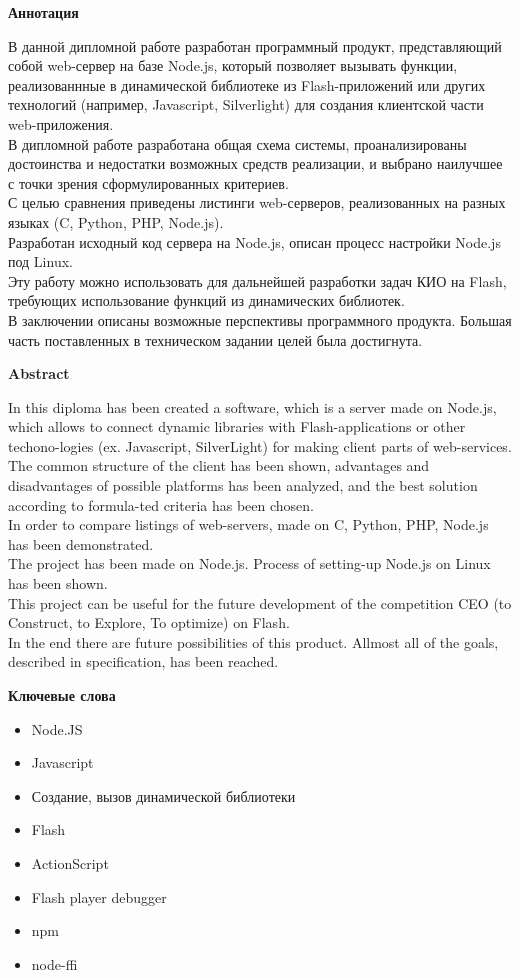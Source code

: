 \begin{center}
\textbf{Аннотация}
\end{center}
В данной дипломной работе разработан программный продукт, представляющий собой web-сервер на базе Node.js, который позволяет вызывать функции, реализованнные в динамической библиотеке из Flash-приложений или других технологий (например, Javascript, Silverlight) для создания клиентской части web-приложения.\\
В дипломной работе разработана общая схема системы, проанализированы достоинства и недостатки возможных средств реализации, и выбрано наилучшее с точки зрения сформулированных критериев. \\
С целью сравнения приведены листинги web-серверов, реализованных на разных языках (C, Python, PHP, Node.js).\\
Разработан исходный код сервера на Node.js, описан процесс настройки Node.js под Linux.\\
Эту работу можно использовать для дальнейшей разработки задач КИО на Flash, требующих использование функций из динамических библиотек. \\
В заключении описаны возможные перспективы программного продукта. Большая часть поставленных в техническом задании целей была достигнута.

\newpage
\begin{center}
\textbf{Abstract}
\end{center}
In this diploma has been created a software, which is a server made on Node.js, which allows to connect dynamic libraries with Flash-applications or other techono-logies (ex. Javascript, SilverLight) for making client parts of web-services.\\
The common structure of the client has been shown, advantages and disadvantages of possible platforms has been analyzed, and the best solution according to formula-ted criteria has been chosen.\\
In order to compare listings of web-servers, made on C, Python, PHP, Node.js has been demonstrated.\\
The project has been made on Node.js. Process of setting-up Node.js on Linux has been shown.\\
This project can be useful for the future development of the competition CEO (to Construct, to Explore, To optimize) on Flash.\\
In the end there are future possibilities of this product. Allmost all of the goals, described in specification, has been reached.
\newpage
\begin{center}
\textbf{Ключевые слова}
\end{center}
\begin{itemize}
  \item Node.JS
  \item Javascript
  \item Создание, вызов динамической библиотеки
  \item Flash
  \item ActionScript
  \item Flash player debugger
  \item npm
  \item node-ffi
\end{itemize}